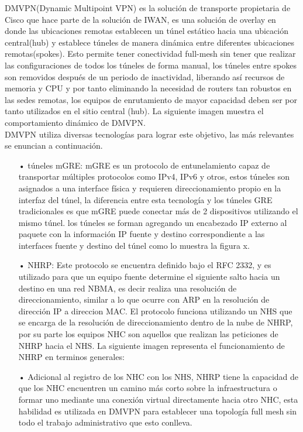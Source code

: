 DMVPN(Dynamic Multipoint VPN) es la solución de transporte propietaria de Cisco que hace parte de la solución de IWAN, es una solución de overlay en donde las ubicaciones remotas establecen un túnel estático hacia una ubicación central(hub) y establece túneles de manera dinámica entre diferentes ubicaciones remotas(spokes). Esto permite tener conectividad full-mesh sin tener que realizar las configuraciones de todos los túneles de forma manual, los túneles entre spokes son removidos después de un periodo de inactividad, liberando así recursos de memoria y CPU y por tanto eliminando la necesidad de routers tan robustos en las sedes remotas, los equipos de enrutamiento de mayor capacidad deben ser por tanto utilizados en el sitio central (hub). La siguiente imagen muestra el comportamiento dinámico de DMVPN.
\\
DMVPN utiliza diversas tecnologías para lograr este objetivo, las más relevantes se enuncian a continuación.


\begin{itemize}
\item[•]túneles mGRE: mGRE es un protocolo de entunelamiento capaz de transportar múltiples protocolos como IPv4, IPv6 y otros, estos túneles son asignados a una interface física y requieren direccionamiento propio en la interfaz del túnel, la diferencia entre esta tecnología y los túneles GRE tradicionales es que mGRE puede conectar más de 2 dispositivos utilizando el mismo túnel.  
los túneles se forman agregando un encabezado IP externo al paquete con la información IP fuente y destino correspondiente a las interfaces fuente y destino del túnel como lo muestra la figura x.
\item[•]NHRP:  Este protocolo se encuentra definido bajo el RFC 2332, y es utilizado para que un equipo fuente determine el siguiente salto hacia un destino en una red NBMA, es decir realiza una resolución de direccionamiento, similar a lo que ocurre con ARP en la resolución de dirección IP a direccion MAC. El protocolo funciona utilizando un NHS que se encarga de la resolución de direccionamiento dentro de la nube de NHRP, por su parte los equipos NHC son aquellos que realizan las peticiones de NHRP hacia el NHS.
La siguiente imagen representa el funcionamiento de NHRP en terminos generales:
\item[•]Adicional al registro de los NHC con los NHS, NHRP tiene la capacidad de que los NHC encuentren un camino más corto sobre la infraestructura o formar uno mediante una conexión virtual directamente hacia otro NHC, esta habilidad es utilizada en DMVPN para establecer una topología full mesh sin todo el trabajo administrativo que esto conlleva.
\end{itemize}

